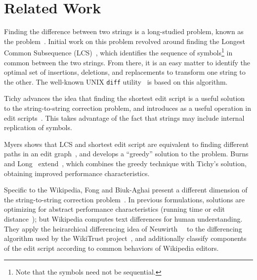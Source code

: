 \section{Related Work}

Finding the difference between two strings is a long-studied problem,
known as the  problem~\cite{Wagner1974}.
Initial work on this problem revolved around finding the
Longest Common Subsequence (LCS)~\cite{Gusfield1999}, which identifies the
sequence of symbols\footnote{Note that the symbols need not be sequential.}
in common between the two strings.
From there, it is an easy matter to identify the optimal
set of insertions, deletions, and replacements to transform
one string to the other.
The well-known UNIX \texttt{diff} utility~\cite{Hunt1976} is based
on this algorithm.

Tichy advances the idea that finding the shortest edit script is a
useful solution to the string-to-string correction problem, and
introduces  as a useful operation in edit
scripts~\cite{Tichy1984}.
This takes advantage of the fact that strings may include internal
replication of symbols.

Myers shows that LCS and shortest edit script are equivalent to finding
different paths in an edit graph~\cite{Myers1986}, and develops a
``greedy'' solution to the problem.
Burns and Long~\cite{Burns1997} extend~\cite{Reichenberger1991},
which combines the greedy technique with Tichy's solution,
obtaining improved performance characteristics.

Specific to the Wikipedia, Fong and Biuk-Aghai present a different
dimension of the string-to-string correction problem~\cite{Fong2010}.
In previous formulations, solutions are optimizing for abstract
performance characteristics (\eg running time or
edit distance~\cite{Levenshtein1966}); but Wikipedia computes text differences
for human understanding.
They apply the heirarchical differencing idea of
Neuwirth~\etal~\cite{Neuwirth1992} to the differencing algorithm used by the
WikiTrust project~\cite{www07}, and additionally classify components
of the edit script according to common behaviors of Wikipedia editors.

